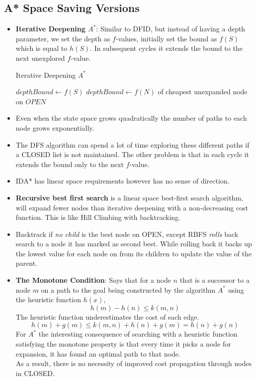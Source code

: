 \documentclass[a4paper]{article}
\begin{document}
\subsection{A* Space Saving Versions}
\begin{itemize}
    \item \textbf{Iterative Deepening $A^*$}: Similar to DFID, but instead of having a depth parameter, we set the depth as $f$-values, initially set the bound as $f(S)$ which is equal to $h(S)$. In subsequent cycles it extends the bound to the next unexplored $f$-value.
    \begin{algorithm}[H]
        \caption{Iterative Deepening $A^*$}
        \begin{algorithmic}[1]
            \Statex {}
            \State $depthBound\gets f(S)$
                \State {}
                \State $depthBound\gets f(N)$ of cheapest unexpanded node on $OPEN$
            \EndWhile
        \end{algorithmic}
    \end{algorithm}
    \item Even when the state space grows quadratically the number of paths to each node grows exponentially.
    \item The DFS algorithm can spend a lot of time exploring these different paths if a CLOSED list is not maintained. The other problem is that in each cycle it extends the bound only to the next $f$-value.
    \item IDA* has linear space requirements however has no sense of direction.
    \item \textbf{Recursive best first search} is a linear space best-first search algorithm, will expand fewer nodes than iterative deepening with a non-decreasing cost function. This is like Hill Climbing with backtracking.
    \item Backtrack if \textit{no child} is the best node on OPEN, except RBFS \textit{rolls} back search to a node it has marked as second best. While rolling back it backs up the lowest value for each node on from its children to update the value of the parent.
    \item \textbf{The Monotone Condition}: Says that for a node $n$ that is a successor to a node $m$ on a path to the goal being constructed by the algorithm $A^*$ using the heuristic function $h(x)$,
    \begin{equation*}
        h(m)-h(n)\leq k(m,n)
    \end{equation*}
    The heuristic function underestimates the cost of each edge.
    \begin{equation*}
        h(m)+g(m)\leq k(m,n)+h(n)+g(m) = h(n)+g(n)
    \end{equation*}
    For $A^*$ the interesting consequence of searching with a heuristic function satisfying the monotone property is that every time it picks a node for expansion, it has found an optimal path to that node.\\
    As a result, there is no necessity of improved cost propagation through nodes in CLOSED.
\end{itemize}
\end{document}
